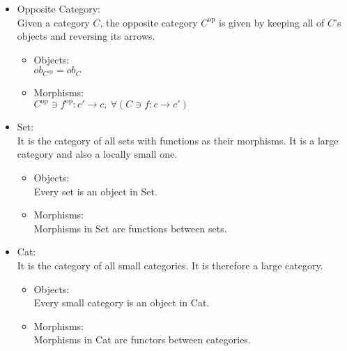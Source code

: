 \begin{itemize}
  \item Opposite Category:\\
    Given a category $C$, the opposite category $C^\mathrm{op}$ is given by
    keeping all of $C$'s objects and reversing its arrows.
    \cite{nlab:opposite_category}
    \begin{itemize}
      \item Objects:\\
        $ob_{C^\mathrm{op}} = ob_C$
      \item Morphisms:\\
        $C^{\mathrm{op}} \ni f^{\mathrm{op}} : c' \to c,
          \ \forall (C \ni f : c \to c')$
    \end{itemize}

  \item Set:\\
    It is the category of all sets with functions as their morphisms.
    It is a large category and also a locally small one. \cite{nlab:set}
    \begin{itemize}
      \item Objects:\\
        Every set is an object in Set.
      \item Morphisms:\\
        Morphisms in Set are functions between sets.
    \end{itemize}

  \item Cat:\\
    It is the category of all small categories. It is therefore a large category.
    \cite{nlab:cat}
    \begin{itemize}
      \item Objects:\\
        Every small category is an object in Cat.
      \item Morphisms:\\
        Morphisms in Cat are functors between categories.
    \end{itemize}
\end{itemize}
